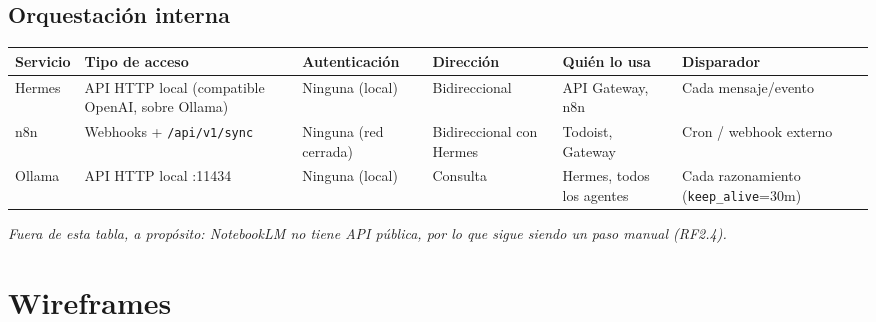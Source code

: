 \documentclass[11pt,a4paper]{article}
\begin{document}
\vspace{0.4cm}
\subsection*{Orquestación interna}
\begin{tabularx}{\textwidth}{@{}p{2cm}p{2.2cm}p{2.1cm}p{2.9cm}p{2.2cm}X@{}}
\toprule
Servicio & Tipo de acceso & Autenticación & Dirección & Quién lo usa & Disparador \\
\midrule
Hermes & API HTTP local (compatible OpenAI, sobre Ollama) & Ninguna (local) & Bidireccional & API Gateway, n8n & Cada mensaje/evento \\
n8n & Webhooks + \texttt{/api/v1/sync} & Ninguna (red cerrada) & Bidireccional con Hermes & Todoist, Gateway & Cron / webhook externo \\
Ollama & API HTTP local :11434 & Ninguna (local) & Consulta & Hermes, todos los agentes & Cada razonamiento (\texttt{keep\_alive}=30m) \\
\bottomrule
\end{tabularx}

\textit{Fuera de esta tabla, a propósito: NotebookLM no tiene API pública, por lo que sigue siendo un paso manual (RF2.4).}

\section{Wireframes}
\end{document}
